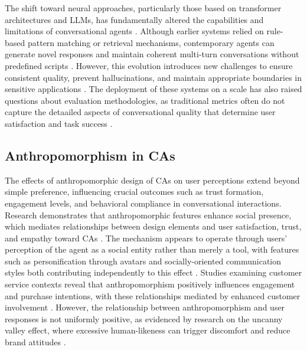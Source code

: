 \documentclass{article}
\begin{document}
The shift toward neural approaches, particularly those based on transformer architectures and LLMs, has fundamentally altered the capabilities and limitations of conversational agents \citep{finch2023dont}. Although earlier systems relied on rule-based pattern matching or retrieval mechanisms, contemporary agents can generate novel responses and maintain coherent multi-turn conversations without predefined scripts \citep{fu2022learning}. However, this evolution introduces new challenges to ensure consistent quality, prevent hallucinations, and maintain appropriate boundaries in sensitive applications \citep{dam2024complete}. The deployment of these systems on a scale has also raised questions about evaluation methodologies, as traditional metrics often do not capture the detaailed aspects of conversational quality that determine user satisfaction and task success \citep{finch2023dont}.

\subsection{Anthropomorphism in CAs}

The effects of anthropomorphic design of CAs on user perceptions extend beyond simple preference, influencing crucial outcomes such as trust formation, engagement levels, and behavioral compliance in conversational interactions. Research demonstrates that anthropomorphic features enhance social presence, which mediates relationships between design elements and user satisfaction, trust, and empathy toward CAs \citep{meyer2023leverage,ischen2024communication}. The mechanism appears to operate through users' perception of the agent as a social entity rather than merely a tool, with features such as personification through avatars and socially-oriented communication styles both contributing independently to this effect \citep{meyer2023leverage}. Studies examining customer service contexts reveal that anthropomorphism positively influences engagement and purchase intentions, with these relationships mediated by enhanced customer involvement \citep{depaula2025anthropomorphism}. However, the relationship between anthropomorphism and user responses is not uniformly positive, as evidenced by research on the uncanny valley effect, where excessive human-likeness can trigger discomfort and reduce brand attitudes \citep{soni2024chatbot}.
\end{document}
